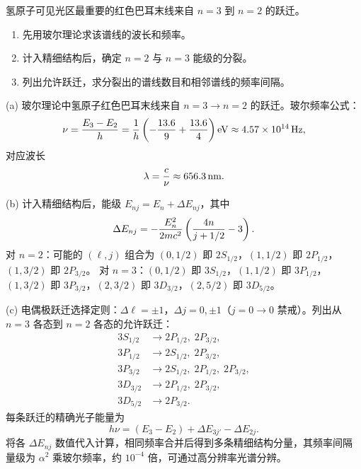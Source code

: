 \begin{question}
氢原子可见光区最重要的红色巴耳末线来自 $n=3$ 到 $n=2$ 的跃迁。
\begin{enumerate}
\item 先用玻尔理论求该谱线的波长和频率。
\item 计入精细结构后，确定 $n=2$ 与 $n=3$ 能级的分裂。
\item 列出允许跃迁，求分裂出的谱线数目和相邻谱线的频率间隔。
\end{enumerate}
\end{question}
\begin{solution}
(a) 玻尔理论中氢原子红色巴耳末线来自 $n=3\to n=2$ 的跃迁。玻尔频率公式：
\[
\nu={E_3-E_2\over h}
={1\over h}\left(-{13.6\over9}+{13.6\over4}\right)\mathrm{eV}
\approx 4.57\times10^{14}\,\mathrm{Hz},
\]
对应波长
\[
\lambda={c\over\nu}\approx 656.3\,\mathrm{nm}.
\]

(b) 计入精细结构后，能级 $E_{nj}=E_n+\Delta E_{nj}$，其中
\[
\Delta E_{nj}=-{E_n^2\over2mc^2}\left({4n\over j+1/2}-3\right).
\]
对 $n=2$：可能的 $(\ell,j)$ 组合为 $(0,1/2)$ 即 $2S_{1/2}$，$(1,1/2)$ 即 $2P_{1/2}$，$(1,3/2)$ 即 $2P_{3/2}$。
对 $n=3$：$(0,1/2)$ 即 $3S_{1/2}$，$(1,1/2)$ 即 $3P_{1/2}$，$(1,3/2)$ 即 $3P_{3/2}$，$(2,3/2)$ 即 $3D_{3/2}$，$(2,5/2)$ 即 $3D_{5/2}$。

(c) 电偶极跃迁选择定则：$\Delta\ell=\pm1$，$\Delta j=0,\pm1$（$j=0\to0$ 禁戒）。列出从 $n=3$ 各态到 $n=2$ 各态的允许跃迁：
\[
\begin{aligned}
3S_{1/2} &\to 2P_{1/2},\; 2P_{3/2},\\
3P_{1/2} &\to 2S_{1/2},\; 2P_{3/2},\\
3P_{3/2} &\to 2S_{1/2},\; 2P_{1/2},\; 2P_{3/2},\\
3D_{3/2} &\to 2P_{1/2},\; 2P_{3/2},\\
3D_{5/2} &\to 2P_{3/2}.
\end{aligned}
\]
每条跃迁的精确光子能量为
\[
h\nu = (E_3-E_2) + \Delta E_{3j'} - \Delta E_{2j}.
\]
将各 $\Delta E_{nj}$ 数值代入计算，相同频率合并后得到多条精细结构分量，其频率间隔量级为 $\alpha^2$ 乘玻尔频率，约 $10^{-4}$ 倍，可通过高分辨率光谱分辨。
\end{solution}

